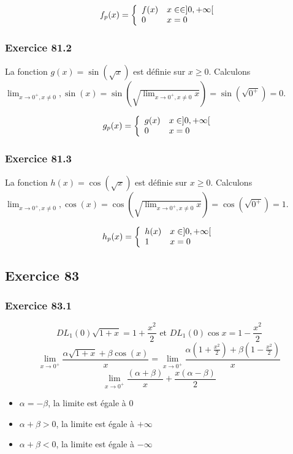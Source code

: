 \documentclass[]{book}
\theoremstyle{definition}
\begin{document}
$$f_p(x) =
\left\{ 
\begin{array}{l l}
f(x) & x \in \in ]0,+\infty[ \\
0 & x = 0\\
\end{array}
\right. 
$$ 


\subsubsection*{Exercice 81.2}
La fonction $g(x) = \sin(\sqrt{x})$ est d\'efinie sur $x \geq 0$. Calculons $\lim_{x \to 0^{+}, x \neq 0}, \sin(x) = \sin(\sqrt{\lim_{x \to 0^{+},x \neq 0} x}) = \sin(\sqrt{0^{+}}) = 0$.

$$g_p(x) =
\left\{ 
\begin{array}{l l}
g(x) & x \in ]0,+\infty[ \\
0 & x = 0\\
\end{array}
\right. 
$$ 


\subsubsection*{Exercice 81.3}
La fonction $h(x) = \cos(\sqrt{x})$ est d\'efinie sur $x \geq 0$. Calculons $\lim_{x \to 0^{+}, x \neq 0}, \cos(x) = \cos(\sqrt{\lim_{x \to 0^{+},x \neq 0} x}) = \cos(\sqrt{0^{+}}) = 1$.

$$h_p(x) =
\left\{ 
\begin{array}{l l}
h(x) & x \in ]0,+\infty[ \\
1 & x = 0\\
\end{array}
\right. 
$$ 


\subsection*{Exercice 83}
\subsubsection*{Exercice 83.1}
$$DL_1(0)\sqrt{1+x} = 1+\frac{x^2}{2} \textrm{   et   } DL_1(0)\cos{x} = 1 - \frac{x^2}{2}$$
$$\lim_{x\to0^{+}} \frac{\alpha\sqrt{1+x} + \beta\cos(x)}{x} = \lim_{x\to0^{+}} \frac{\alpha(1 + \frac{x^2}{2}) + \beta(1 - \frac{x^2}{2})}{x}$$
$$\lim_{x\to0^{+}} \frac{(\alpha+\beta)}{x}+\frac{x(\alpha-\beta)}{2}$$

\begin{itemize}
\item $\alpha = -\beta$, la limite est \'egale \`a $0$
\item $\alpha + \beta > 0$, la limite est \'egale \`a $+\infty$
\item $\alpha + \beta < 0$, la limite est \'egale \`a $-\infty$
\end{itemize}
\end{document}
